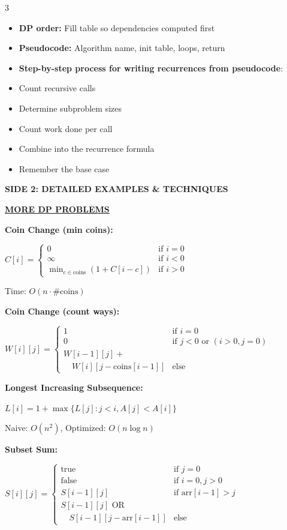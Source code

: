 \documentclass[7pt,landscape]{article}
\newcommand{\sect}[1]{\vspace{1mm}\textbf{\underline{#1}}\vspace{0.5mm}}
\begin{document}
\begin{multicols}{3}
\begin{itemize}[leftmargin=*, nosep]
\item \textbf{DP order:} Fill table so dependencies computed first
\item \textbf{Pseudocode:} Algorithm name, init table, loops, return
\item \textbf{Step-by-step process for writing recurrences from pseudocode}:
\item Count recursive calls
\item Determine subproblem sizes
\item Count work done per call
\item Combine into the recurrence formula
\item Remember the base case
\end{itemize}

\vfill\null
\columnbreak
\newpage

\begin{center}
\textbf{\large SIDE 2: DETAILED EXAMPLES \& TECHNIQUES}
\end{center}

\sect{MORE DP PROBLEMS}

\textbf{Coin Change (min coins):}

$C[i] = \begin{cases} 
0 & \text{if } i=0 \\ 
\infty & \text{if } i<0 \\ 
\min_{c \in \text{coins}}(1 + C[i-c]) & \text{if } i>0 
\end{cases}$

Time: $O(n \cdot \text{\# coins})$

\textbf{Coin Change (count ways):}

$W[i][j] = \begin{cases} 
1 & \text{if } i=0 \\ 
0 & \text{if } j<0 \text{ or } (i>0, j=0) \\ 
W[i-1][j] + & \\
\quad W[i][j-\text{coins}[i-1]] & \text{else} 
\end{cases}$

\textbf{Longest Increasing Subsequence:}

$L[i] = 1 + \max\{L[j] : j < i, A[j] < A[i]\}$

Naive: $O(n^2)$, Optimized: $O(n\log n)$

\textbf{Subset Sum:}

$S[i][j] = \begin{cases} 
\text{true} & \text{if } j=0 \\ 
\text{false} & \text{if } i=0, j>0 \\ 
S[i-1][j] & \text{if arr}[i-1] > j \\ 
S[i-1][j] \text{ OR } & \\
\quad S[i-1][j-\text{arr}[i-1]] & \text{else} 
\end{cases}$


\end{multicols}
\end{document}
